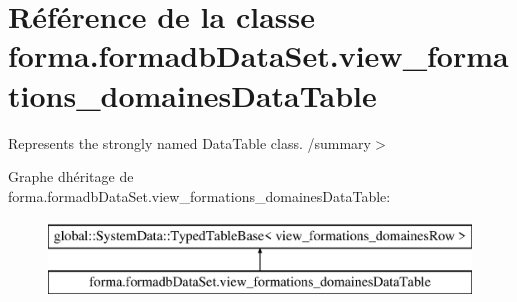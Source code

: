 \hypertarget{classforma_1_1formadb_data_set_1_1view__formations__domaines_data_table}{}\section{Référence de la classe forma.\+formadb\+Data\+Set.\+view\+\_\+formations\+\_\+domaines\+Data\+Table}
\label{classforma_1_1formadb_data_set_1_1view__formations__domaines_data_table}


Represents the strongly named Data\+Table class. /summary$>$  


Graphe d\textquotesingle{}héritage de forma.\+formadb\+Data\+Set.\+view\+\_\+formations\+\_\+domaines\+Data\+Table\+:\begin{figure}[H]
\begin{center}
\leavevmode
\includegraphics[height=2.000000cm]{classforma_1_1formadb_data_set_1_1view__formations__domaines_data_table}
\end{center}
\end{figure}

